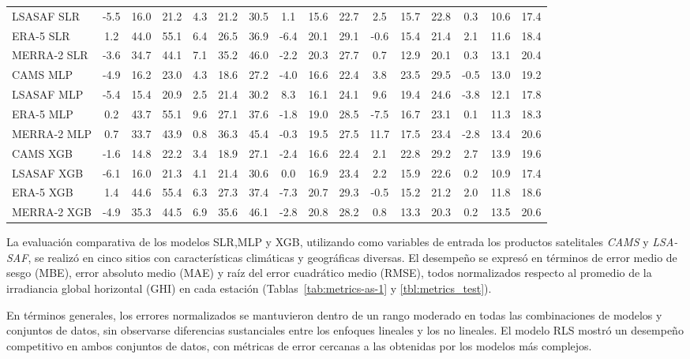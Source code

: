 \begin{table}
{\begin{tabular}{|l|ccc|ccc|ccc|ccc|ccc|}
      LSASAF SLR  & -5.5 & 16.0 & 21.2 &  4.3 & 21.2 & 30.5 &  1.1 & 15.6 & 22.7 &  2.5 & 15.7 & 22.8 &  0.3 & 10.6 & 17.4 \\
      ERA-5 SLR   &  1.2 & 44.0 & 55.1 &  6.4 & 26.5 & 36.9 & -6.4 & 20.1 & 29.1 & -0.6 & 15.4 & 21.4 &  2.1 & 11.6 & 18.4 \\
      MERRA-2 SLR & -3.6 & 34.7 & 44.1 &  7.1 & 35.2 & 46.0 & -2.2 & 20.3 & 27.7 &  0.7 & 12.9 & 20.1 &  0.3 & 13.1 & 20.4 \\
      \hline
      CAMS MLP    & -4.9 & 16.2 & 23.0 &  4.3 & 18.6 & 27.2 & -4.0 & 16.6 & 22.4 &  3.8 & 23.5 & 29.5 & -0.5 & 13.0 & 19.2 \\
      LSASAF MLP  & -5.4 & 15.4 & 20.9 &  2.5 & 21.4 & 30.2 &  8.3 & 16.1 & 24.1 &  9.6 & 19.4 & 24.6 & -3.8 & 12.1 & 17.8 \\
      ERA-5 MLP   &  0.2 & 43.7 & 55.1 &  9.6 & 27.1 & 37.6 & -1.8 & 19.0 & 28.5 & -7.5 & 16.7 & 23.1 &  0.1 & 11.3 & 18.3 \\
      MERRA-2 MLP &  0.7 & 33.7 & 43.9 &  0.8 & 36.3 & 45.4 & -0.3 & 19.5 & 27.5 & 11.7 & 17.5 & 23.4 & -2.8 & 13.4 & 20.6 \\
      \hline
      CAMS XGB    & -1.6 & 14.8 & 22.2 &  3.4 & 18.9 & 27.1 & -2.4 & 16.6 & 22.4 &  2.1 & 22.8 & 29.2 &  2.7 & 13.9 & 19.6 \\
      LSASAF XGB  & -6.1 & 16.0 & 21.3 &  4.1 & 21.4 & 30.6 &  0.0 & 16.9 & 23.4 &  2.2 & 15.9 & 22.6 &  0.2 & 10.9 & 17.4 \\
      ERA-5 XGB   &  1.4 & 44.6 & 55.4 &  6.3 & 27.3 & 37.4 & -7.3 & 20.7 & 29.3 & -0.5 & 15.2 & 21.2 &  2.0 & 11.8 & 18.6 \\
      MERRA-2 XGB & -4.9 & 35.3 & 44.5 &  6.9 & 35.6 & 46.1 & -2.8 & 20.8 & 28.2 &  0.8 & 13.3 & 20.3 &  0.2 & 13.5 & 20.6 \\
      \hline
    \end{tabular}%
  }
\end{table}

La evaluación comparativa de los modelos SLR,MLP y XGB, utilizando como variables de entrada los productos satelitales \textit{CAMS} y \textit{LSA-SAF}, se realizó en cinco sitios con características climáticas y geográficas diversas. El desempeño se expresó en términos de error medio de sesgo (MBE), error absoluto medio (MAE) y raíz del error cuadrático medio (RMSE), todos normalizados respecto al promedio de la irradiancia global horizontal (GHI) en cada estación (Tablas~\ref{tab:metrics-as-1} y \ref{tbl:metrics_test}).  

En términos generales, los errores normalizados se mantuvieron dentro de un rango moderado en todas las combinaciones de modelos y conjuntos de datos, sin observarse diferencias sustanciales entre los enfoques lineales y los no lineales. El modelo RLS mostró un desempeño competitivo en ambos conjuntos de datos, con métricas de error cercanas a las obtenidas por los modelos más complejos.  

